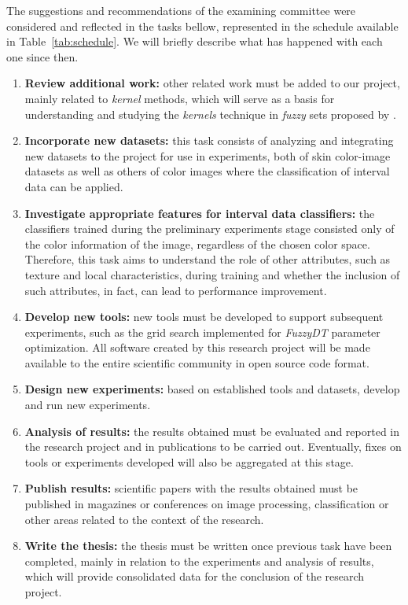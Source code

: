 The suggestions and recommendations of the examining committee were considered and reflected in the tasks bellow, represented in the schedule available in Table~\ref{tab:schedule}. We will briefly describe what has happened with each one since then.

\begin{enumerate}
    \item \textbf{Review additional work:} other related work must be added to our project, mainly related to \emph{kernel} methods, which will serve as a basis for understanding and studying the \emph{kernels} technique in \emph{fuzzy} sets proposed by \citet{guevara:14}.

    \item \textbf{Incorporate new datasets:} this task consists of analyzing and integrating new datasets to the project for use in experiments, both of skin color-image datasets as well as others of color images where the classification of interval data can be applied.

    \item \textbf{Investigate appropriate features for interval data classifiers:} the classifiers trained during the preliminary experiments stage consisted only of the color information of the image, regardless of the chosen color space. Therefore, this task aims to understand the role of other attributes, such as texture and local characteristics, during training and whether the inclusion of such attributes, in fact, can lead to performance improvement.

    \item \textbf{Develop new tools:} new tools must be developed to support subsequent experiments, such as the grid search implemented for \emph{FuzzyDT} parameter optimization. All software created by this research project will be made available to the entire scientific community in open source code format.

    \item \textbf{Design new experiments:} based on established tools and datasets, develop and run new experiments.

    \item \textbf{Analysis of results:} the results obtained must be evaluated and reported in the research project and in publications to be carried out. Eventually, fixes on tools or experiments developed will also be aggregated at this stage.

    \item \textbf{Publish results:} scientific papers with the results obtained must be published in magazines or conferences on image processing, classification or other areas related to the context of the research.

    \item \textbf{Write the thesis:} the thesis must be written once previous task have been completed, mainly in relation to the experiments and analysis of results, which will provide consolidated data for the conclusion of the research project.
\end{enumerate}


